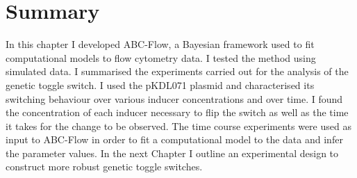 \section{Summary}


In this chapter I developed ABC-Flow, a Bayesian framework used to fit computational models to flow cytometry data. I tested the method using simulated data. I summarised the experiments carried out for the analysis of the genetic toggle switch. I used the pKDL071 plasmid and characterised its switching behaviour over various inducer concentrations and over time. I found the concentration of each inducer necessary to flip the switch as well as the time it takes for the change to be observed. The time course experiments were used as input to ABC-Flow in order to fit a computational model to the data and infer the parameter values. In the next Chapter I outline an experimental design to construct more robust genetic toggle switches.







 
 